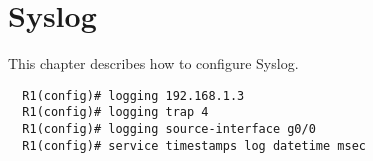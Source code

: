 \section{Syslog}
This chapter describes how to configure Syslog.
\begin{verbatim}
  R1(config)# logging 192.168.1.3
  R1(config)# logging trap 4
  R1(config)# logging source-interface g0/0
  R1(config)# service timestamps log datetime msec
\end{verbatim}
